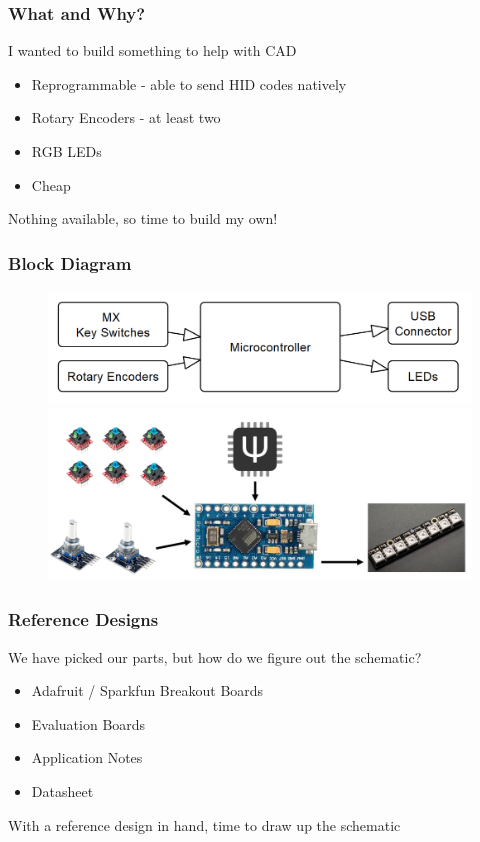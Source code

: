 \documentclass[t]{beamer}
\begin{document}
\begin{frame}
\frametitle{What and Why?}
I wanted to build something to help with CAD \\[10pt]

\begin{itemize}
	\item Reprogrammable - able to send HID codes natively 
	\item Rotary Encoders - at least two
	\item RGB LEDs
	\item Cheap
\end{itemize}
\vspace{10pt}
Nothing available, so time to build my own!
\end{frame}
\begin{frame}
\frametitle{Block Diagram}

\begin{figure}
	\centering
	\includegraphics[width=0.9\linewidth]{blockDiag.PNG}
	\includegraphics[width=0.9\linewidth]{blockDiagParts.PNG}
\end{figure}
\end{frame}
\begin{frame}
\frametitle{Reference Designs}
We have picked our parts, but how do we figure out the schematic? \\[10pt]

\begin{itemize}
	\item Adafruit / Sparkfun Breakout Boards
	\item Evaluation Boards
	\item Application Notes
	\item Datasheet
\end{itemize}
\vspace{10pt}
With a reference design in hand, time to draw up the schematic
\end{frame}
\end{document}

